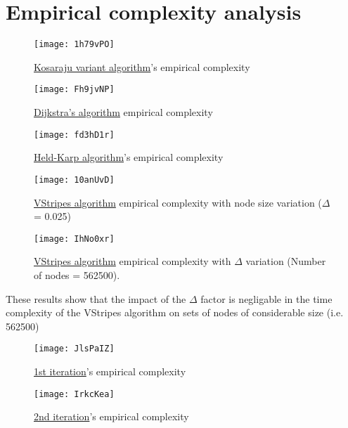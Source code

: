 \chapter{Empirical complexity analysis} \label{empirical}

\begin{figure}[H]
    \centering
    \texttt{[image: 1h79vPO]}
    \caption{\hyperref[algorithm-scc-kosaraju-v]{Kosaraju variant algorithm}'s empirical complexity}
\end{figure}

\begin{figure}[H]
    \centering
    \texttt{[image: Fh9jvNP]}
    \caption{\hyperref[algorithm-shortestpath-dijkstra]{Dijkstra's algorithm} empirical complexity}
\end{figure}

\begin{figure}[H]
    \centering
    \texttt{[image: fd3hD1r]}
    \caption{\hyperref[algorithm-tsp-heldkarp]{Held-Karp algorithm}'s empirical complexity}
\end{figure}

\begin{figure}[H]
    \centering
    \texttt{[image: 10anUvD]}
    \caption{\hyperref[algorithm-vstripes]{VStripes algorithm} empirical complexity with node size variation ($\Delta$ = 0.025)}
\end{figure}

\begin{figure}[H]
    \centering
    \texttt{[image: IhNo0xr]}
    \caption{\hyperref[algorithm-vstripes]{VStripes algorithm} empirical complexity with $\Delta$ variation (Number of nodes = 562500).}
\end{figure}

These results show that the impact of the $\Delta$ factor is negligable in the time complexity of the VStripes algorithm on sets of nodes of considerable size (i.e. 562500)

\begin{figure}[H]
    \centering
    \texttt{[image: JlsPaIZ]}
    \caption{\hyperref[iterations]{1st iteration}'s empirical complexity}
\end{figure}

\begin{figure}[H]
    \centering
    \texttt{[image: IrkcKea]}
    \caption{\hyperref[iterations]{2nd iteration}'s empirical complexity}
\end{figure}

